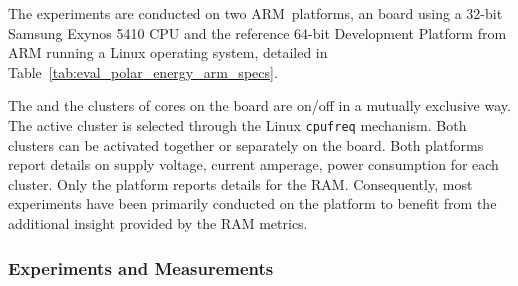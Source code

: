The experiments are conducted on two ARM~\bl platforms, an \odrx board using a
32-bit Samsung Exynos 5410 CPU and the reference 64-bit \juno Development
Platform from ARM running a Linux operating system, detailed in
Table~\ref{tab:eval_polar_energy_arm_specs}.

The \big and the \little clusters of cores on the \odr board are on/off in a
mutually exclusive way. The active cluster is selected through the Linux
\verb|cpufreq| mechanism. Both clusters can be activated together or separately
on the \juno board. Both platforms report details on supply voltage, current
amperage, power consumption for each cluster. Only the \odr platform reports
details for the RAM. Consequently, most experiments have been primarily
conducted on the \odr platform to benefit from the additional insight provided
by the RAM metrics.

\subsubsection{Experiments and Measurements}

